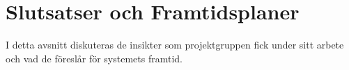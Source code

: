 \section{Slutsatser och Framtidsplaner}
I detta avsnitt diskuteras de insikter som projektgruppen fick under sitt arbete
och vad de föreslår för systemets framtid. 
